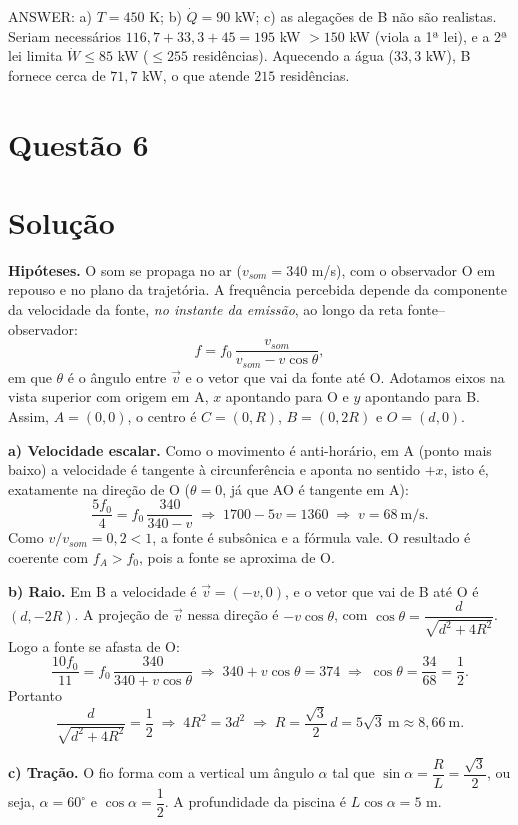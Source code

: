 \documentclass{article}%
\begin{document}
\medskip
ANSWER: a) $T=450$ K; b) $\dot Q=90$ kW; c) as alegações de B não são realistas. Seriam necessários $116{,}7+33{,}3+45=195$ kW $>150$ kW (viola a 1ª lei), e a 2ª lei limita $\dot W\le 85$ kW ($\le 255$ residências). Aquecendo a água ($33{,}3$ kW), B fornece cerca de $71{,}7$ kW, o que atende $215$ residências.%
\newpage%
\section*{Questão 6}

\section*{Solução}

\textbf{Hipóteses.} O som se propaga no ar ($v_{som}=340$ m/s), com o observador O em repouso e no plano da trajetória. A frequência percebida depende da componente da velocidade da fonte, \emph{no instante da emissão}, ao longo da reta fonte--observador:
\[
f=f_0\,\frac{v_{som}}{v_{som}-v\cos\theta},
\]
em que $\theta$ é o ângulo entre $\vec v$ e o vetor que vai da fonte até O. Adotamos eixos na vista superior com origem em A, $x$ apontando para O e $y$ apontando para B. Assim, $A=(0,0)$, o centro é $C=(0,R)$, $B=(0,2R)$ e $O=(d,0)$.

\textbf{a) Velocidade escalar.} Como o movimento é anti-horário, em A (ponto mais baixo) a velocidade é tangente à circunferência e aponta no sentido $+x$, isto é, exatamente na direção de O ($\theta=0$, já que AO é tangente em A):
\[
\frac{5f_0}{4}=f_0\,\frac{340}{340-v}\;\Rightarrow\;1700-5v=1360\;\Rightarrow\; v=68\ \text{m/s}.
\]
Como $v/v_{som}=0{,}2<1$, a fonte é subsônica e a fórmula vale. O resultado é coerente com $f_A>f_0$, pois a fonte se aproxima de O.

\textbf{b) Raio.} Em B a velocidade é $\vec v=(-v,0)$, e o vetor que vai de B até O é $(d,-2R)$. A projeção de $\vec v$ nessa direção é $-v\cos\theta$, com $\cos\theta=\dfrac{d}{\sqrt{d^2+4R^2}}$. Logo a fonte se afasta de O:
\[
\frac{10f_0}{11}=f_0\,\frac{340}{340+v\cos\theta}\;\Rightarrow\;340+v\cos\theta=374\;\Rightarrow\;\cos\theta=\frac{34}{68}=\frac12 .
\]
Portanto
\[
\frac{d}{\sqrt{d^2+4R^2}}=\frac12\;\Rightarrow\;4R^2=3d^2\;\Rightarrow\;R=\frac{\sqrt3}{2}\,d=5\sqrt3\ \text{m}\approx 8{,}66\ \text{m}.
\]

\textbf{c) Tração.} O fio forma com a vertical um ângulo $\alpha$ tal que $\sin\alpha=\dfrac{R}{L}=\dfrac{\sqrt3}{2}$, ou seja, $\alpha=60^\circ$ e $\cos\alpha=\dfrac12$. A profundidade da piscina é $L\cos\alpha=5$ m.
\end{document}
